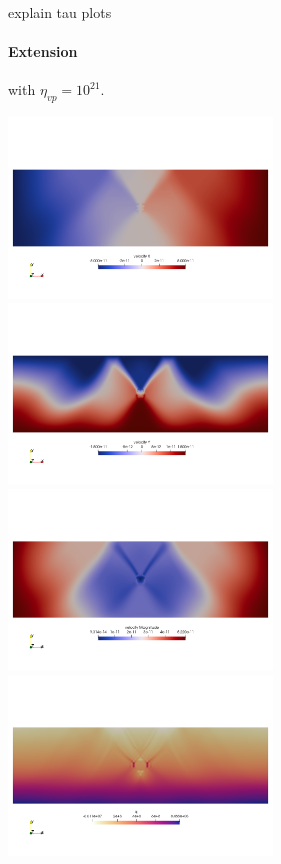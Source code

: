explain tau plots

\newpage
\paragraph{Extension} with $\eta_{vp}=10^{21}$.

\begin{center}
\includegraphics[width=7cm]{python_codes/fieldstone_70/extension/u}
\includegraphics[width=7cm]{python_codes/fieldstone_70/extension/v}\\
\includegraphics[width=7cm]{python_codes/fieldstone_70/extension/vel}
\includegraphics[width=7cm]{python_codes/fieldstone_70/extension/q}\\

\end{center}
